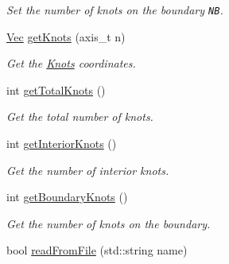 \begin{CompactItemize}
\begin{CompactList}\small\item\em Set the number of knots on the boundary {\tt NB}. \item\end{CompactList}\item 
\hyperlink{Traits_8hpp_327b06345fe9c9ae56c556c92b78272b}{Vec} \hyperlink{classKnots_9254851feaf50e49998af12c091d026e}{getKnots} (axis\_\-t n)
\begin{CompactList}\small\item\em Get the \hyperlink{classKnots}{Knots} coordinates. \item\end{CompactList}\item 
\hypertarget{classKnots_69d1a4285bab652eabf0f7b08e7ceb89}{
int \hyperlink{classKnots_69d1a4285bab652eabf0f7b08e7ceb89}{getTotalKnots} ()}
\label{classKnots_69d1a4285bab652eabf0f7b08e7ceb89}

\begin{CompactList}\small\item\em Get the total number of knots. \item\end{CompactList}\item 
\hypertarget{classKnots_4e0df59e8d0aa4e61216756cca9ad58b}{
int \hyperlink{classKnots_4e0df59e8d0aa4e61216756cca9ad58b}{getInteriorKnots} ()}
\label{classKnots_4e0df59e8d0aa4e61216756cca9ad58b}

\begin{CompactList}\small\item\em Get the number of interior knots. \item\end{CompactList}\item 
\hypertarget{classKnots_f972f5599f91f975ceb8abfe5624f36b}{
int \hyperlink{classKnots_f972f5599f91f975ceb8abfe5624f36b}{getBoundaryKnots} ()}
\label{classKnots_f972f5599f91f975ceb8abfe5624f36b}

\begin{CompactList}\small\item\em Get the number of knots on the boundary. \item\end{CompactList}\item 
\hypertarget{classKnots_d9d352df696c00157f8c7177efd50925}{
bool \hyperlink{classKnots_d9d352df696c00157f8c7177efd50925}{readFromFile} (std::string name)}
\label{classKnots_d9d352df696c00157f8c7177efd50925}


\end{CompactItemize}

